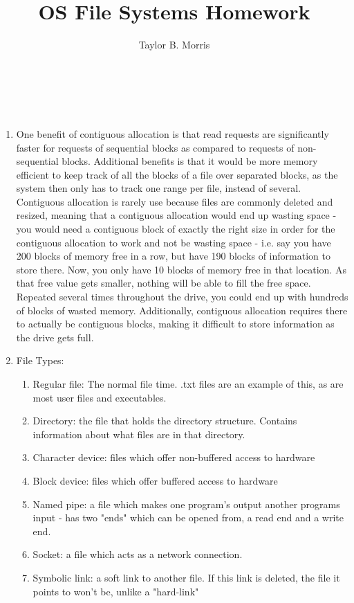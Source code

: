 \documentclass[12pt,letterpaper]{report}
\author{Taylor B. Morris}
\title{OS File Systems Homework}
\begin{document}
\makeatletter
{\huge\noindent\@title\large\\\@author\\\@date}
\makeatother
\begin{enumerate}

\item One benefit of contiguous allocation is that read requests are significantly 
faster for requests of sequential blocks as compared to requests of non-sequential 
blocks. Additional benefits is that it would be more memory efficient to keep track of 
all the blocks of a file over separated blocks, as the system then only has to track
one range per file, instead of several. Contiguous allocation is rarely use because
files are commonly deleted and resized, meaning that a contiguous allocation would end
up wasting space - you would need a contiguous block of exactly the right size in order
for the contiguous allocation to work and not be wasting space - i.e. say you have 200
blocks of memory free in a row, but have 190 blocks of information to store there. Now,
you only have 10 blocks of memory free in that location. As that free value gets smaller,
nothing will be able to fill the free space. Repeated several times throughout the drive,
you could end up with hundreds of blocks of wasted memory. Additionally, contiguous
allocation requires there to actually be contiguous blocks, making it difficult to store
information as the drive gets full.

\item File Types: 
\begin{enumerate}[{(Type }1{)}]
\item Regular file: The normal file time. .txt files are an example of this, as are most user files and executables. 
\item Directory: the file that holds the directory structure. Contains information about what files are in that directory.
\item Character device: files which offer non-buffered access to hardware
\item Block device: files which offer buffered access to hardware
\item Named pipe: a file which makes one program's output another programs input - has two "ends" which can be opened from, a read end and a write end.
\item Socket: a file which acts as a network connection.
\item Symbolic link: a soft link to another file. If this link is deleted, the file it points to won't be, unlike a "hard-link"
\end{enumerate}


\end{enumerate}
\end{document}
